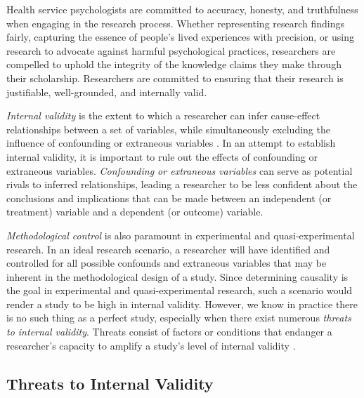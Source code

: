 \documentclass[
  11pt,
]{book}
\begin{document}
Health service psychologists are committed to accuracy, honesty, and truthfulness when engaging in the research process. Whether representing research findings fairly, capturing the essence of people's lived experiences with precision, or using research to advocate against harmful psychological practices, researchers are compelled to uphold the integrity of the knowledge claims they make through their scholarship. Researchers are committed to ensuring that their research is justifiable, well-grounded, and internally valid.

\emph{Internal validity} is the extent to which a researcher can infer cause-effect relationships between a set of variables, while simultaneously excluding the influence of confounding or extraneous variables \citep{campbell_experimental_1963, cook_quasi-experimentation_1979}. In an attempt to establish internal validity, it is important to rule out the effects of confounding or extraneous variables. \emph{Confounding or extraneous variables} can serve as potential rivals to inferred relationships, leading a researcher to be less confident about the conclusions and implications that can be made between an independent (or treatment) variable and a dependent (or outcome) variable.

\emph{Methodological control} is also paramount in experimental and quasi-experimental research. In an ideal research scenario, a researcher will have identified and controlled for all possible confounds and extraneous variables that may be inherent in the methodological design of a study. Since determining causality is the goal in experimental and quasi-experimental research, such a scenario would render a study to be high in internal validity. However, we know in practice there is no such thing as a perfect study, especially when there exist numerous \emph{threats to internal validity}. Threats consist of factors or conditions that endanger a researcher's capacity to amplify a study's level of internal validity \citep{onwuegbuzie_expanding_2000}.

\subsection{Threats to Internal Validity}\label{threats-to-internal-validity}
\end{document}
